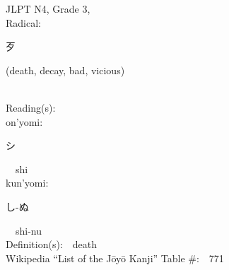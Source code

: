 \begin{multicols}{2}
{JLPT N4, Grade 3, \\Radical:\ \ {\begin{CJK}{UTF8}{min} 歹 \end{CJK}} (death, decay, bad, vicious) } \\
Reading(s):\ \ \\
{\hspace*{1em}}on'yomi:\ \ \\
{\hspace*{2em}}{\begin{CJK}{UTF8}{min} シ \end{CJK}}\ \ shi\ \ \\
{\hspace*{1em}}kun'yomi:\ \ \\
{\hspace*{2em}}{\begin{CJK}{UTF8}{min} し-ぬ \end{CJK}}\ \ shi-nu\ \ \\
Definition(s):\ \ death \\
Wikipedia ``List of the J\=oy\=o Kanji'' Table \#:\ \ 771 \\
\ \ \\
\end{multicols}



